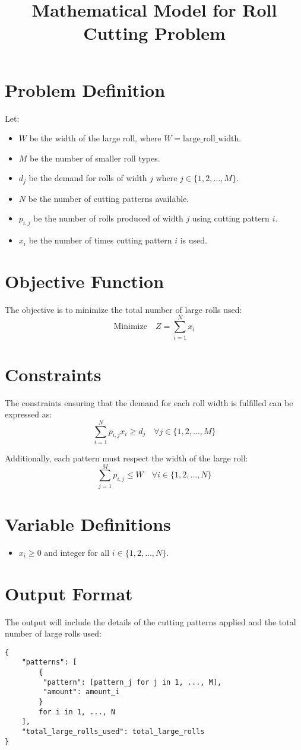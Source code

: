 \documentclass{article}
\begin{document}
\title{Mathematical Model for Roll Cutting Problem}
\author{}
\date{}
\maketitle

\section*{Problem Definition}
Let:
\begin{itemize}
    \item \( W \) be the width of the large roll, where \( W = \text{large\_roll\_width} \).
    \item \( M \) be the number of smaller roll types.
    \item \( d_j \) be the demand for rolls of width \( j \) where \( j \in \{1, 2, \ldots, M\} \).
    \item \( N \) be the number of cutting patterns available.
    \item \( p_{i,j} \) be the number of rolls produced of width \( j \) using cutting pattern \( i \).
    \item \( x_i \) be the number of times cutting pattern \( i \) is used.
\end{itemize}

\section*{Objective Function}
The objective is to minimize the total number of large rolls used:
\[
\text{Minimize} \quad Z = \sum_{i=1}^{N} x_i
\]

\section*{Constraints}
The constraints ensuring that the demand for each roll width is fulfilled can be expressed as:
\[
\sum_{i=1}^{N} p_{i,j} x_i \geq d_j \quad \forall j \in \{1, 2, \ldots, M\}
\]

Additionally, each pattern must respect the width of the large roll:
\[
\sum_{j=1}^{M} p_{i,j} \leq W \quad \forall i \in \{1, 2, \ldots, N\}
\]

\section*{Variable Definitions}
\begin{itemize}
    \item \( x_i \geq 0 \) and integer for all \( i \in \{1, 2, \ldots, N\} \).
\end{itemize}

\section*{Output Format}
The output will include the details of the cutting patterns applied and the total number of large rolls used:
\begin{verbatim}
{
    "patterns": [
        {
         "pattern": [pattern_j for j in 1, ..., M],
         "amount": amount_i
        }
        for i in 1, ..., N
    ],
    "total_large_rolls_used": total_large_rolls
}
\end{verbatim}
\end{document}

